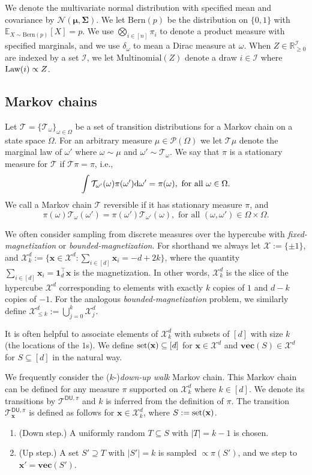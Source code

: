 \documentclass[11pt]{article}
\newcommand{\defeq}{:=}
\newcommand{\R}{\mathbb{R}}
\newcommand{\1}{\mathbf{1}}
\newcommand{\0}{\mathbf{0}}
\newcommand{\E}{\mathbb{E}}
\newcommand{\Nor}{\mathcal{N}}
\newcommand{\dd}{\textup{d}}
\newcommand{\msig}{\mathbf{\Sigma}}
\newcommand{\vmu}{\boldsymbol{\mu}}
\newcommand{\Bern}{\mathrm{Bern}}
\newcommand{\MN}{\mathrm{Multinomial}}
\newcommand{\Law}{\textup{Law}}
\newcommand{\vx}{{\mathbf{x}}}
\newcommand{\calI}{{\mathcal{I}}}
\newcommand{\calP}{{\mathcal{P}}}
\newcommand{\calT}{{\mathcal{T}}}
\newcommand{\calX}{{\mathcal{X}}}
\newcommand{\TDU}[1]{\calT^{\mathsf{DU}, #1}}
\newcommand{\set}{\textup{set}}
\newcommand{\vvec}{\mathbf{vec}}
\begin{document}
We denote the multivariate normal distribution with specified mean and covariance by $\Nor(\vmu, \msig)$. We let $\Bern(p)$ be the distribution on $\{0, 1\}$ with $\E_{X \sim \Bern(p)}[X] = p$. We use $\bigotimes_{i \in [n]} \pi_i$ to denote a product measure with specified marginals, and we use $\delta_\omega$ to mean a Dirac measure at $\omega$. When $Z \in \R_{\ge 0}^{\calI}$ are indexed by a set $\calI$, we let $\MN(Z)$ denote a draw $i \in \calI$ where $\Law(i) \propto Z$.

\subsection{Markov chains}\label{ssec:mcmc}

Let $\calT = \{\calT_{\omega}\}_{\omega \in \Omega}$ be a set of transition distributions for a Markov chain on a state space $\Omega$. For an arbitrary measure $\mu \in \calP(\Omega)$ we let $\calT\mu$ denote the marginal law of $\omega'$ where $\omega \sim \mu$ and $\omega' \sim \calT_\omega$.
We say that $\pi$ is a stationary measure for $\calT$ if $\calT \pi = \pi$, i.e.,
\[\int \calT_{\omega'}(\omega) \pi(\omega') \dd \omega' = \pi(\omega), \text{ for all } \omega \in \Omega.\]
We call a Markov chain $\calT$ reversible if it has stationary measure $\pi$, and
\[\pi(\omega) \calT_\omega(\omega') = \pi(\omega')\calT_{\omega'}(\omega), \text{ for all } (\omega, \omega') \in \Omega \times \Omega.\]


We often consider sampling from discrete measures over the hypercube with \emph{fixed-magnetization} or \emph{bounded-magnetization}. For shorthand we always let $\calX \defeq \{\pm 1\}$, and $\calX^d_k \defeq \{\vx \in \calX^d: \sum_{i \in [d]} \vx_i = -d + 2k\}$, where the quantity $\sum_{i \in [d]} \vx_i = \1_d^\top \vx$ is the magnetization. In other words, $\calX^d_k$ is the slice of the hypercube $\calX^d$ corresponding to elements with exactly $k$ copies of $1$ and $d- k$ copies of $-1$. For the analogous \emph{bounded-magnetization} problem, we similarly define $\calX^d_{\le k} \defeq \bigcup_{j = 0}^k \calX^d_j$.

It is often helpful to associate elements of $\calX^d_{ k}$ with subsets of $[d]$ with size $k$ (the locations of the $1$s). We define $\set(\vx) \subseteq [d]$ for $\vx \in \calX^d$ and $\vvec(S) \in \calX^d$ for $S \subseteq [d]$ in the natural way.

We frequently consider the ($k$-)\emph{down-up walk} Markov chain. This Markov chain can be defined for any measure $\pi$ supported on $\calX^d_k$ where $k \in [d]$. We denote its transitions by $\TDU{\pi}$ and $k$ is inferred from the definition of $\pi$. The transition $\TDU{\pi}_{\vx}$ is defined as follows for $\vx \in \calX^d_k$, where $S \defeq \set(\vx)$.
\begin{enumerate}
    \item (Down step.) A uniformly random $T \subseteq S$ with $|T| = k - 1$ is chosen.
    \item (Up step.) A set $S' \supseteq T$ with $|S'| = k$ is sampled $\propto \pi(S')$, and we step to $\vx' = \vvec(S')$.
\end{enumerate}
\end{document}
